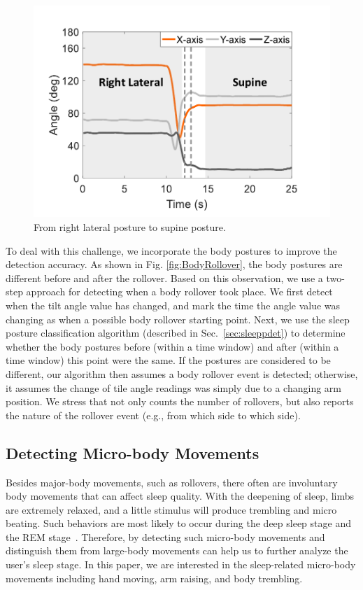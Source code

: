 \begin{figure}[!t]
\begin{minipage}[t]{0.31\linewidth}
    \includegraphics[width=0.97\linewidth]{Figures/RightToSupine.pdf}\centering
  \caption{From right lateral posture to supine posture.}\label{fig:RightToLeft}
\end{minipage}
\end{figure}

To deal with this challenge, we incorporate the body postures to improve the detection accuracy. As shown in Fig. \ref{fig:BodyRollover},
the body postures are different before and after the rollover. Based on this observation, we use a two-step approach for detecting when a
body rollover took place. We first detect when the tilt angle value has changed, and mark the time the angle value was changing as when a
possible body rollover starting point. Next, we use the sleep posture classification algorithm (described in Sec.~\ref{sec:sleeppdet}) to
determine whether the body postures before (within a time window) and after (within a time window) this point were the same. If the
postures are considered to be different, our algorithm then assumes a body rollover event is detected; otherwise, it assumes the change of
tile angle readings was simply due to a changing arm position. We stress that {\systemname} not only counts the number of rollovers, but
also reports the nature of the rollover event (e.g., from which side to which side).


\subsection{Detecting Micro-body Movements \label{sec:microbo}}

Besides major-body movements, such as rollovers, there often are involuntary body movements that can affect sleep quality. With the
deepening of sleep, limbs are extremely relaxed, and a little stimulus will produce trembling and micro beating. Such behaviors are most
likely to occur during the deep sleep stage and the REM stage~\cite{ancoli2003role,Jean2000Sleep}. Therefore, by detecting such micro-body
movements and distinguish them from large-body movements can help us to further analyze the user's sleep stage. In this paper, we are
interested in the sleep-related micro-body movements including hand moving, arm raising, and body trembling.

